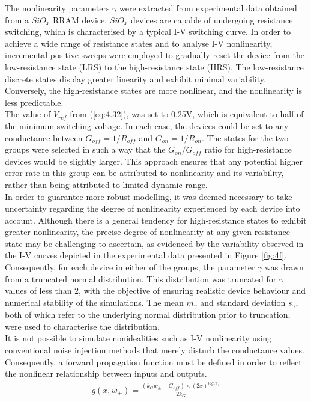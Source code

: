 \noindent The nonlinearity parameters $\gamma$ were extracted from experimental data obtained from a $SiO_x$ RRAM device. $SiO_x$ devices are capable of undergoing resistance switching, which is characterised by a typical I-V switching curve. In order to achieve a wide range of resistance states and to analyse I-V nonlinearity, incremental positive sweeps were employed to gradually reset the device from the low-resistance state (LRS) to the high-resistance state (HRS). The low-resistance discrete states display greater linearity and exhibit minimal variability. Conversely, the high-resistance states are more nonlinear, and the nonlinearity is less predictable.\\

\noindent The value of $V_{ref}$ from (\ref{eq:4.32}), was set to 0.25V, which is equivalent to half of the minimum switching voltage. In each case, the devices could be set to any conductance between $G_{off} = 1/R_{off}$ and $G_{on} = 1/R_{on}$. The states for the two groups were selected in such a way that the $G_{on}/G_{off}$ ratio for high-resistance devices would be slightly larger. This approach ensures that any potential higher error rate in this group can be attributed to nonlinearity and its variability, rather than being attributed to limited dynamic range.\\

\noindent In order to guarantee more robust modelling, it was deemed necessary to take uncertainty regarding the degree of nonlinearity experienced by each device into account. Although there is a general tendency for high-resistance states to exhibit greater nonlinearity, the precise degree of nonlinearity at any given resistance state may be challenging to ascertain, as evidenced by the variability observed in the I-V curves depicted in the experimental data presented in Figure \ref{fig:4f}. \\

\noindent Consequently, for each device in either of the groups, the parameter $\gamma$ was drawn from a truncated normal distribution. This distribution was truncated for $\gamma$ values of less than 2, with the objective of ensuring realistic device behaviour and numerical stability of the simulations. The mean $m_\gamma$ and standard deviation $s_\gamma$, both of which refer to the underlying normal distribution prior to truncation, were used to characterise the distribution.\\

\noindent It is not possible to simulate nonidealities such as I-V nonlinearity using conventional noise injection methods that merely disturb the conductance values. Consequently, a forward propagation function must be defined in order to reflect the nonlinear relationship between inputs and outputs.
\begin{align}
g(x, w_\pm) = \frac{\left( k_Gw_\pm + G_{off}\right) \times \left( 2x \right)^{log_2\gamma_\pm}}{2k_G} \label{eq:4.34}
\end{align}

